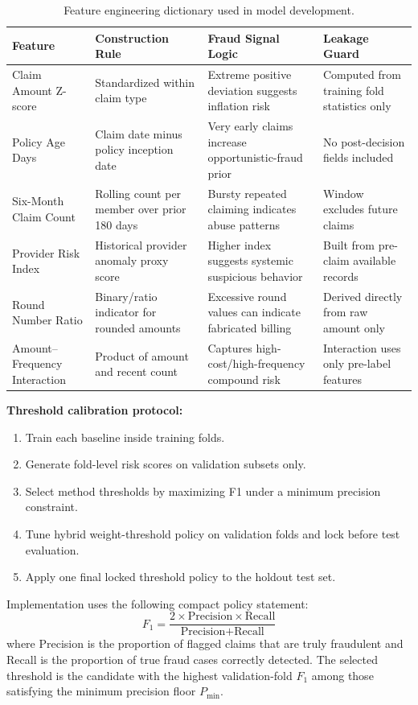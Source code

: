 \documentclass[12pt,a4paper]{report}
\begin{document}
\begin{table}[H]
\caption{Feature engineering dictionary used in model development.}
\label{tab:feature_dictionary}
\begin{tabular}{p{}p{}p{}p{}}
\toprule
\textbf{Feature} & \textbf{Construction Rule} & \textbf{Fraud Signal Logic} & \textbf{Leakage Guard} \\
\midrule
Claim Amount Z-score & Standardized within claim type & Extreme positive deviation suggests inflation risk & Computed from training fold statistics only \\
Policy Age Days & Claim date minus policy inception date & Very early claims increase opportunistic-fraud prior & No post-decision fields included \\
Six-Month Claim Count & Rolling count per member over prior 180 days & Bursty repeated claiming indicates abuse patterns & Window excludes future claims \\
Provider Risk Index & Historical provider anomaly proxy score & Higher index suggests systemic suspicious behavior & Built from pre-claim available records \\
Round Number Ratio & Binary/ratio indicator for rounded amounts & Excessive round values can indicate fabricated billing & Derived directly from raw amount only \\
Amount--Frequency Interaction & Product of amount and recent count & Captures high-cost/high-frequency compound risk & Interaction uses only pre-label features \\
\bottomrule
\end{tabular}
\end{table}

\noindent\textbf{Threshold calibration protocol:}
\begin{enumerate}
\item Train each baseline inside training folds.
\item Generate fold-level risk scores on validation subsets only.
\item Select method thresholds by maximizing F1 under a minimum precision constraint.
\item Tune hybrid weight-threshold policy on validation folds and lock before test evaluation.
\item Apply one final locked threshold policy to the holdout test set.
\end{enumerate}

Implementation uses the following compact policy statement:
\begin{equation}
F_1=\frac{2\times\text{Precision}\times\text{Recall}}{\text{Precision}+\text{Recall}}
\end{equation}
where Precision is the proportion of flagged claims that are truly fraudulent and Recall is the proportion of true fraud cases correctly detected.
The selected threshold is the candidate with the highest validation-fold $F_1$ among those satisfying the minimum precision floor $P_{\min}$.
\end{document}
